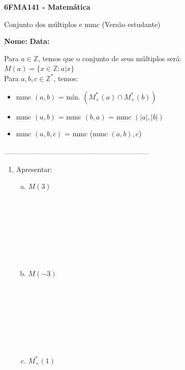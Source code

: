 \documentclass[a4paper,14pt]{article}
\begin{document}
	
	\noindent\textbf{6FMA141 - Matemática} 
	
	\begin{center}Conjunto dos múltiplos e mmc (Versão estudante)
	\end{center}
	
	\noindent\textbf{Nome:} \underline{\hspace{10cm}}
	\noindent\textbf{Data:} \underline{\hspace{4cm}}
	
	
	\begin{multicols}{2}
	    \noindent Para $a \in \mathbb{Z}$, temos que o conjunto de seus múltiplos será: \\
	    $M(a) = \{x \in \mathbb{Z}: a | x\}$ \\
	    Para $a, b, c \in \mathbb{Z}^*$, temos:
	    \begin{itemize}
	    	\item mmc $(a, b)$ = mín. $(M_+^*(a) \cap M_+^*(b))$
	    	\item mmc $(a, b)$ = mmc $(b, a)$ = mmc $(|a|, |b|)$
	    	\item mmc $(a, b, c)$ = mmc (mmc $(a, b), c$) 
	    \end{itemize}
		\noindent\textsubscript{--------------------------------------------------------------------------}
		\begin{enumerate} 
			\item Apresentar:
			\begin{enumerate}[a)]
				\item $M(3)$ \\\\\\\\\\\\\\\\
				\item $M(-3)$ \\\\\\\\\\\\\\\\
				\item $M_+^*(1)$ \\\\\\\\\\\\\\\\

\end{enumerate}
\end{enumerate}
\end{multicols}
\end{document}
